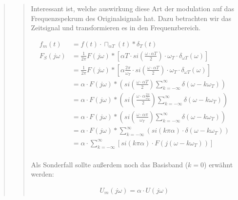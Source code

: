 \begin{quote}
\begin{quote}
        Interessant ist, welche auswirkung diese Art der modulation auf das Frequenzspekrum des Originalsignals hat.
        Dazu betrachten wir das Zeitsignal und transformieren es in den Frequenzbereich.
        
            \begin{equation*}
                \begin{split}
                    f_m (t)   &= f(t) \cdot \sqcap_{\alpha T} (t) \ast \delta_T (t) \\
                    F_S (j\omega) &= \frac{1}{2\pi} F (j\omega) \ast \left [
                    \alpha T \cdot si \left( \frac{\omega \cdot \alpha T}{2} \right) \cdot \omega_T \cdot \delta_{\omega
                    T} (\omega) \right] \\
                    &= \frac{1}{2\pi} F (j\omega) \ast \left [
                    \alpha \frac{2 \pi}{\omega_T} \cdot si \left( \frac{\omega \cdot \alpha T}{2} \right) \cdot \omega_T
                    \cdot \delta_{\omega T} (\omega) \right] \\
                    &= \alpha \cdot F (j \omega) \ast \left ( si \left( \frac{\omega \cdot \alpha T}{2} \right)
                    \sum_{k=-\infty}^{\infty} \delta (\omega - k\omega_T) \right)\\
                    &= \alpha \cdot F (j \omega) \ast \left ( si \left( \frac{\omega \cdot \alpha \frac{2
                    \pi}{\omega_T}}{2} \right) \sum_{k=-\infty}^{\infty} \delta (\omega - k\omega_T) \right)\\
                    &= \alpha \cdot F (j \omega) \ast \left ( si \left( \frac{\omega \cdot \alpha \pi}{\omega_T}
                    \right) \sum_{k=-\infty}^{\infty} \delta (\omega - k\omega_T) \right)\\
                    &= \alpha \cdot F (j \omega) \ast \sum_{k=-\infty}^{\infty} (si(k \pi \alpha) \cdot \delta (\omega -
                    k\omega_T))\\
                    &= \alpha \cdot \sum_{k=-\infty}^{\infty} \left [ si(k \pi \alpha) \cdot F (j(\omega - k\omega_T))
                    \right]\\
                \end{split}
            \end{equation*}
            
        Als Sonderfall sollte außerdem noch das Basisband ($k = 0$) erwähnt werden:
        
       \begin{equation*}
        	\begin{split}
        		U_m (j\omega) = \alpha \cdot U(j\omega)
        	\end{split}
        \end{equation*}        
        

\end{quote}
\end{quote}
